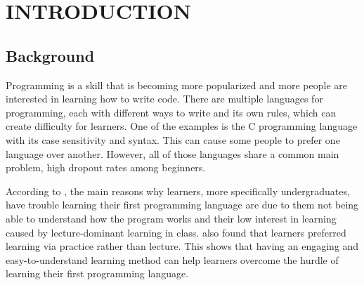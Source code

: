 \chapter{INTRODUCTION}

\section{Background}



Programming is a skill that is becoming more popularized and more people are interested in learning how to write code. There are multiple languages for programming, each with different ways to write and its own rules, which can create difficulty for learners. One of the examples is the C programming language with its case sensitivity and syntax. This can cause some people to prefer one language over another. However, all of those languages share a common main problem, high dropout rates among beginners.

According to \citet{LearnDiff}, the main reasons why learners, more specifically undergraduates, have trouble learning their first programming language are due to them not being able to understand how the program works and their low interest in learning caused by lecture-dominant learning in class. \citet{LearnDiff} also found that learners preferred learning via practice rather than lecture. This shows that having an engaging and easy-to-understand learning method can help learners overcome the hurdle of learning their first programming language.
 
